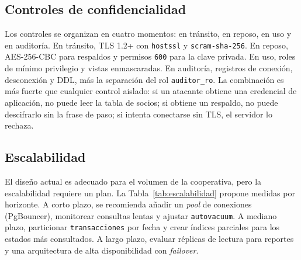 \begin{table}[H]
  \centering
  \caption{Clasificación de la información}
  \label{tab:clasificacion}
\end{table}

\subsection{Controles de confidencialidad}

Los controles se organizan en cuatro momentos: en tránsito, en reposo, en uso
y en auditoría. En tránsito, TLS 1.2+ con \texttt{hostssl} y
\texttt{scram-sha-256}. En reposo, AES-256-CBC para respaldos y permisos
\texttt{600} para la clave privada. En uso, roles de mínimo privilegio y
vistas enmascaradas. En auditoría, registros de conexión, desconexión y DDL,
más la separación del rol \texttt{auditor\_ro}. La combinación es más fuerte
que cualquier control aislado: si un atacante obtiene una credencial de
aplicación, no puede leer la tabla de socios; si obtiene un respaldo, no puede
descifrarlo sin la frase de paso; si intenta conectarse sin TLS, el servidor
lo rechaza.

\subsection{Escalabilidad}

El diseño actual es adecuado para el volumen de la cooperativa, pero la
escalabilidad requiere un plan. La Tabla~\ref{tab:escalabilidad} propone
medidas por horizonte. A corto plazo, se recomienda añadir un \emph{pool} de
conexiones (PgBouncer), monitorear consultas lentas y ajustar
\texttt{autovacuum}. A mediano plazo, particionar \texttt{transacciones} por
fecha y crear índices parciales para los estados más consultados. A largo
plazo, evaluar réplicas de lectura para reportes y una arquitectura de alta
disponibilidad con \emph{failover}.


